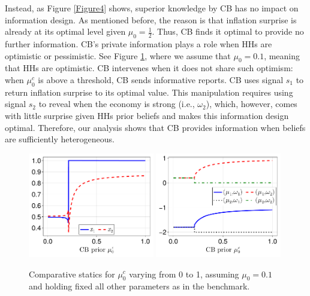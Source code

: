 \documentclass[12pt,a4paper]{article}
\begin{document}
Instead, as Figure \ref{Figure4} shows, superior knowledge by CB has no impact on information design. As mentioned before, the reason is that inflation surprise is already at its optimal level given $\mu_0=\frac{1}{2}$. Thus, CB finds it optimal to provide no further information. CB's private information plays a role when HHs are optimistic or pessimistic. See Figure \ref{Figure4new}, where we assume that $\mu_0 = 0.1$, meaning that HHs are optimistic. CB intervenes when it does not share such optimism: when $\mu_0^c$ is above a threshold, CB sends informative reports. CB uses signal $s_1$ to return inflation surprise to its optimal value. This manipulation requires using signal $s_2$ to reveal when the economy is strong (i.e., $\omega_2$), which, however, comes with little surprise given HHs prior beliefs and makes this information design optimal. Therefore, our analysis shows that CB provides information when beliefs are sufficiently heterogeneous. 

 \begin{figure}[htp!]
    \centering
    \includegraphics[width=0.49\textwidth]{figures/V11/γ=1.0-μ_0=0.1-α=1.0-θ=1.0-δ=0.5-ω_1=1.0-ω_2=-1.0/communication/fig_optimal_x_by_μ_0_c.pdf}
    \includegraphics[width=0.49\textwidth]{figures/V11/γ=1.0-μ_0=0.1-α=1.0-θ=1.0-δ=0.5-ω_1=1.0-ω_2=-1.0/communication/fig_optimal_γ_by_μ_0_c.pdf}
    \caption{Comparative statics for $\mu_0^c$ varying from 0 to 1, assuming $\mu_0=0.1$ and holding fixed all other parameters as in the benchmark.}
    \label{Figure4new}
\end{figure}
\end{document}
